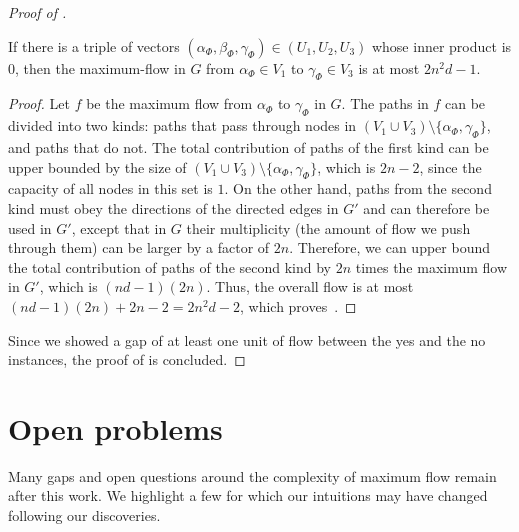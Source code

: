 \begin{proof}[Proof of ]
\begin{claim}\label{claim:second}
If there is a triple of vectors $(\alpha_{\Phi}, \beta_{\Phi}, \gamma_{\Phi})\in (U_1, U_2, U_3)$ whose inner product is $0$, then the maximum-flow in $G$ from $\alpha_{\Phi} \in V_1$ to $\gamma_{\Phi} \in V_3$ is at most $2n^2d -1$.
\end{claim}
\begin{proof}
Let $f$ be the maximum flow from $\alpha_{\Phi}$ to $\gamma_{\Phi}$ in $G$.
The paths in $f$ can be divided into two kinds: paths that pass through nodes in $(V_1\cup V_3)\setminus \{\alpha_{\Phi},\gamma_{\Phi}\}$, and paths that do not.
The total contribution of paths of the first kind can be upper bounded by the size of $(V_1\cup V_3)\setminus \{\alpha_{\Phi},\gamma_{\Phi}\}$, which is $2n-2$, since the capacity of all nodes in this set is $1$.
On the other hand, paths from the second kind must obey the directions of the directed edges in $G'$ and can therefore be used in $G'$, except that in $G$ their multiplicity (the amount of flow we push through them) can be larger by a factor of $2n$.
Therefore, we can upper bound the total contribution of paths of the second kind by $2n$ times the maximum flow in $G'$, which is $(nd-1)(2n)$.
Thus, the overall flow is at most $(nd-1)(2n)+2n-2=2n^2d-2$, which proves~.
\end{proof}
Since we showed a gap of at least one unit of flow between the yes and the no instances, the proof of  is concluded.
\end{proof}



\section{Open problems}\label{Section:Conclusion}

Many gaps and open questions around the complexity of maximum flow remain after this work. We highlight a few for which our intuitions may have changed following our discoveries.

